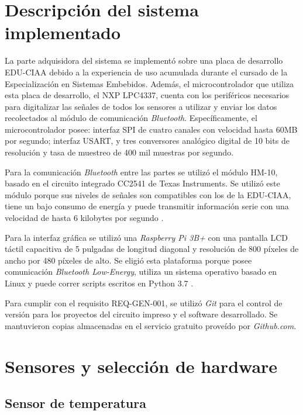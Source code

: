 \section{Descripción del sistema implementado}

La parte adquisidora del sistema se implementó sobre una placa de desarrollo EDU-CIAA debido a la experiencia de uso acumulada durante el cursado de la Especialización en Sistemas Embebidos. Además, el microcontrolador que utiliza esta placa de desarrollo, el NXP LPC4337, cuenta con los periféricos necesarios para digitalizar las señales de todos los sensores a utilizar y enviar los datos recolectados al módulo de comunicación \textit{Bluetooth}. Específicamente, el microcontrolador posee: interfaz SPI de cuatro canales con velocidad hasta 60MB por segundo; interfaz USART, y tres conversores analógico digital de 10 bits de resolución y tasa de muestreo de 400 mil muestras por segundo.

Para la comunicación \textit{Bluetooth} entre las partes se utilizó el módulo HM-10, basado en el circuito integrado CC2541 de Texas Instruments. Se utilizó este módulo porque sus niveles de señales son compatibles con los de la EDU-CIAA, tiene un bajo consumo de energía y puede transmitir información serie con una velocidad de hasta 6 kilobytes por segundo \cite{HM-10}.

Para la interfaz gráfica se utilizó una \textit{Raspberry Pi 3B+} con una pantalla LCD táctil capacitiva de 5 pulgadas de longitud diagonal y resolución de 800 píxeles de ancho por 480 píxeles de alto. Se eligió esta plataforma porque posee comunicación \textit{Bluetooth Low-Energy}, utiliza un sistema operativo basado en Linux y puede correr scripts escritos en Python 3.7 \cite{raspberrypi}.

Para cumplir con el requisito REQ-GEN-001, se utilizó \textit{Git} para el control de versión para los proyectos del circuito impreso y el software desarrollado. Se mantuvieron copias almacenadas en el servicio gratuito proveído por \textit{Github.com}. 

\section{Sensores y selección de hardware}

\subsection{Sensor de temperatura}

